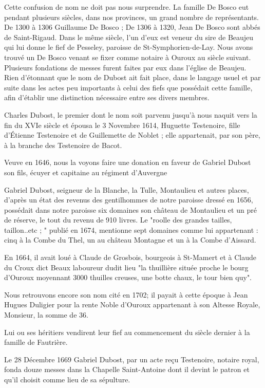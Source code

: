 Cette confusion de nom ne doit pas nous surprendre. La famille De Bosco eut pendant plusieurs siècles, dans nos provinces, un grand nombre de représentants. De 1300 à 1306 Guillaume De Bosco ; De 1306 à 1320, Jean De Bosco sont abbés de Saint-Rigaud. Dans le même siècle, l'un d'eux est veneur du sire de Beaujeu qui lui donne le fief de Pesseley, paroisse de St-Symphorien-de-Lay. Nous avons trouvé un De Bosco venant se fixer comme notaire à Ouroux au siècle suivant. Plusieurs fondations de messes furent faites par eux dans l'église de Beaujeu. Rien d'étonnant que le nom de Dubost ait fait place, dans le langage usuel et par suite dans les actes peu importants à celui des fiefs que possédait cette famille, afin d'établir une distinction nécessaire entre ses divers membres.

Charles Dubost, le premier dont le nom soit parvenu jusqu'à nous naquit vers la fin du XVIe siècle et épousa le 3 Novembre 1614, Huguette Testenoire, fille d'Étienne Testenoire et de Guillemette de Noblet ; elle appartenait, par son père, à la branche des Testenoire de Bacot.

Veuve en 1646, nous la voyons faire une donation en faveur de Gabriel Dubost son fils, écuyer et capitaine au régiment d'Auvergne

Gabriel Dubost, seigneur de la Blanche, la Tulle, Montaulieu et autres places, d'après un état des revenus des gentilhommes de notre paroisse dressé en 1656, possédait dans notre paroisse six domaines son château de Montaulieu et un pré de réserve, le tout du revenu de 910 livres. Le "roolle des grandes tailles, taillon..etc ; " publié en 1674, mentionne sept domaines comme lui appartenant : cinq à la Combe du Thel, un au château Montagne et un à la Combe d'Aissard.

En 1664, il avait loué à Claude de Grosbois, bourgeois à St-Mamert et à Claude du Croux dict Beaux laboureur dudit lieu "la thuillière
située proche le bourg d'Ouroux moyennant 3000 thuilles creuses, une botte chaux, le tour bien quy".

Nous retrouvons encore son nom cité en 1702; il payait à cette époque à Jean Hugues Duligier pour la rente Noble d'Ouroux appartenant à son Altesse Royale, Monsieur, la somme de 36.

Lui ou ses héritiers vendirent leur fief au commencement du siècle dernier à la famille de Fautrière.

Le 28 Décembre 1669 Gabriel Dubost, par un acte reçu Testenoire, notaire royal, fonda douze messes dans la Chapelle Saint-Antoine dont il devint le patron et qu'il choisit comme lieu de sa sépulture.

